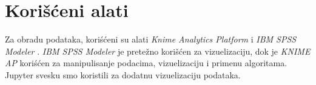 \section{Kori\v{s}\'c{}eni alati}
\label{sec:Alati}

Za obradu podataka, kori\'s{}\'c{}eni su alati \emph{Knime Analytics Platform} \cite{KNIME} i \emph{IBM SPSS Modeler} \cite{SPSS}. \emph{IBM SPSS Modeler} je prete\v{z}no kori\v{s}\'c{}en za vizuelizaciju, dok je \emph{KNIME AP} kori\'s{}\'c{}en za manipulisanje podacima, vizuelizaciju i primenu algoritama. Jupyter svesku \cite{jupyter} smo koristili za dodatnu vizuelizaciju podataka.
